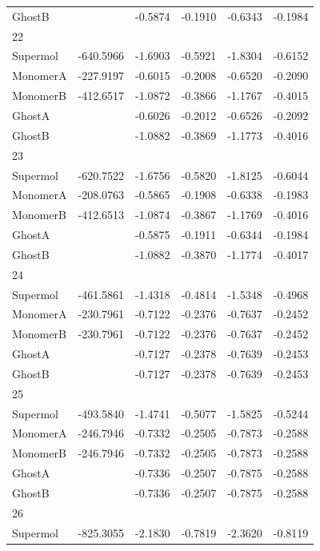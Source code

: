 \documentclass[journal=jctcce,manuscript=article]{achemso}
\begin{document}
\begin{spacing}{1}
\begin{longtable}{lRRRRR}
    GhostB &  & -0.5874 & -0.1910 & -0.6343 & -0.1984 \\
    22 &  &  &  &  &  \\
    Supermol & -640.5966 & -1.6903 & -0.5921 & -1.8304 & -0.6152 \\
    MonomerA & -227.9197 & -0.6015 & -0.2008 & -0.6520 & -0.2090 \\
    MonomerB & -412.6517 & -1.0872 & -0.3866 & -1.1767 & -0.4015 \\
    GhostA &  & -0.6026 & -0.2012 & -0.6526 & -0.2092 \\
    GhostB &  & -1.0882 & -0.3869 & -1.1773 & -0.4016 \\
    23 &  &  &  &  &  \\
    Supermol & -620.7522 & -1.6756 & -0.5820 & -1.8125 & -0.6044 \\
    MonomerA & -208.0763 & -0.5865 & -0.1908 & -0.6338 & -0.1983 \\
    MonomerB & -412.6513 & -1.0874 & -0.3867 & -1.1769 & -0.4016 \\
    GhostA &  & -0.5875 & -0.1911 & -0.6344 & -0.1984 \\
    GhostB &  & -1.0882 & -0.3870 & -1.1774 & -0.4017 \\
    24 &  &  &  &  &  \\
    Supermol & -461.5861 & -1.4318 & -0.4814 & -1.5348 & -0.4968 \\
    MonomerA & -230.7961 & -0.7122 & -0.2376 & -0.7637 & -0.2452 \\
    MonomerB & -230.7961 & -0.7122 & -0.2376 & -0.7637 & -0.2452 \\
    GhostA &  & -0.7127 & -0.2378 & -0.7639 & -0.2453 \\
    GhostB &  & -0.7127 & -0.2378 & -0.7639 & -0.2453 \\
    25 &  &  &  &  &  \\
    Supermol & -493.5840 & -1.4741 & -0.5077 & -1.5825 & -0.5244 \\
    MonomerA & -246.7946 & -0.7332 & -0.2505 & -0.7873 & -0.2588 \\
    MonomerB & -246.7946 & -0.7332 & -0.2505 & -0.7873 & -0.2588 \\
    GhostA &  & -0.7336 & -0.2507 & -0.7875 & -0.2588 \\
    GhostB &  & -0.7336 & -0.2507 & -0.7875 & -0.2588 \\
    26 &  &  &  &  &  \\
    Supermol & -825.3055 & -2.1830 & -0.7819 & -2.3620 & -0.8119 \\

\end{longtable}
\end{spacing}
\end{document}
